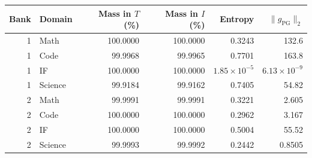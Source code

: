 \begin{tabular}{rlrrrr}
\toprule
Bank & Domain & Mass in $T$ (\%) & Mass in $I$ (\%) & Entropy & $\|g_{\mathrm{PG}}\|_2$ \\
\midrule
1 & Math & 100.0000 & 100.0000 & 0.3243 & 132.6 \\
1 & Code & 99.9968 & 99.9965 & 0.7701 & 163.8 \\
1 & IF & 100.0000 & 100.0000 & $1.85\times10^{-5}$ & $6.13\times10^{-9}$ \\
1 & Science & 99.9184 & 99.9162 & 0.7405 & 54.82 \\
2 & Math & 99.9991 & 99.9991 & 0.3221 & 2.605 \\
2 & Code & 100.0000 & 100.0000 & 0.2962 & 3.167 \\
2 & IF & 100.0000 & 100.0000 & 0.5004 & 55.52 \\
2 & Science & 99.9993 & 99.9992 & 0.2442 & 0.8505 \\
\bottomrule
\end{tabular}
